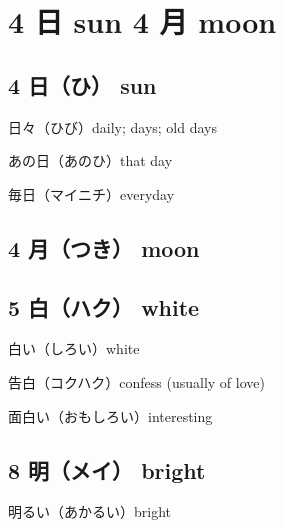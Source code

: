 \chapter{4 日 sun 4 月 moon}

\section{4 日（ひ） sun}

日々（ひび）daily; days; old days

あの日（あのひ）that day

毎日（マイニチ）everyday

\section{4 月（つき） moon}

\section{5 白（ハク） white}

白い（しろい）white

告白（コクハク）confess (usually of love)

面白い（おもしろい）interesting

\section{8 明（メイ） bright}

明るい（あかるい）bright
